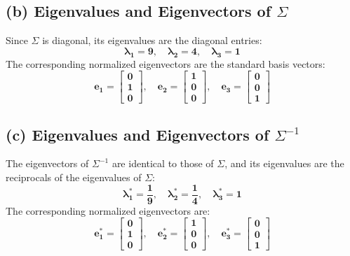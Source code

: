 \documentclass[11pt]{article}
\begin{document}
\subsection*{(b) Eigenvalues and Eigenvectors of $\Sigma$}
Since $\Sigma$ is diagonal, its eigenvalues are the diagonal entries:
\[
\mathbf{\lambda_1 = 9, \quad \lambda_2 = 4, \quad \lambda_3 = 1}
\]
The corresponding normalized eigenvectors are the standard basis vectors:
\[
\mathbf{e_1 = \begin{bmatrix} 0 \\ 1 \\ 0 \end{bmatrix}, \quad e_2 = \begin{bmatrix} 1 \\ 0 \\ 0 \end{bmatrix}, \quad e_3 = \begin{bmatrix} 0 \\ 0 \\ 1 \end{bmatrix}}
\]

\subsection*{(c) Eigenvalues and Eigenvectors of $\Sigma^{-1}$}
The eigenvectors of $\Sigma^{-1}$ are identical to those of $\Sigma$, and its eigenvalues are the reciprocals of the eigenvalues of $\Sigma$:
\[
\mathbf{\lambda_1^* = \frac{1}{9}, \quad \lambda_2^* = \frac{1}{4}, \quad \lambda_3^* = 1}
\]
The corresponding normalized eigenvectors are:
\[
\mathbf{e_1^* = \begin{bmatrix} 0 \\ 1 \\ 0 \end{bmatrix}, \quad e_2^* = \begin{bmatrix} 1 \\ 0 \\ 0 \end{bmatrix}, \quad e_3^* = \begin{bmatrix} 0 \\ 0 \\ 1 \end{bmatrix}}
\]

\end{document}
